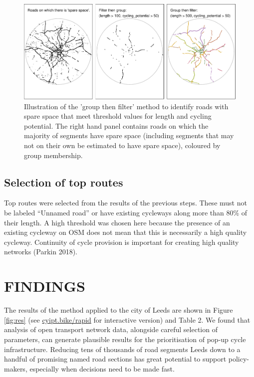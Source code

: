 \documentclass[
]{article}
\begin{document}
\begin{figure}
\includegraphics[width=1\linewidth]{article_files/figure-latex/levels-1} \caption{Illustration of the 'group then filter' method to identify roads with spare space that meet threshold values for length and cycling potential. The right hand panel contains roads on which the majority of segments have spare space (including segments that may not on their own be estimated to have spare space), coloured by group membership.}\label{fig:levels}
\end{figure}

\hypertarget{selection-of-top-routes}{%
\subsection{Selection of top routes}\label{selection-of-top-routes}}

Top routes were selected from the results of the previous steps.
These must not be labeled ``Unnamed road'' or have existing cycleways along more than 80\% of their length.
A high threshold was chosen here because the presence of an existing cycleway on OSM does not mean that this is necessarily a high quality cycleway.
Continuity of cycle provision is important for creating high quality networks (Parkin 2018).

\hypertarget{findings}{%
\section{FINDINGS}\label{findings}}

The results of the method applied to the city of Leeds are shown in Figure \ref{fig:res} (see \href{https://www.cyipt.bike/rapid/west-yorkshire/}{cyipt.bike/rapid} for interactive version) and Table 2.
We found that analysis of open transport network data, alongside careful selection of parameters, can generate plausible results for the prioritisation of pop-up cycle infrastructure.
Reducing tens of thousands of road segments Leeds down to a handful of promising named road sections has great potential to support policy-makers, especially when decisions need to be made fast.
\end{document}
